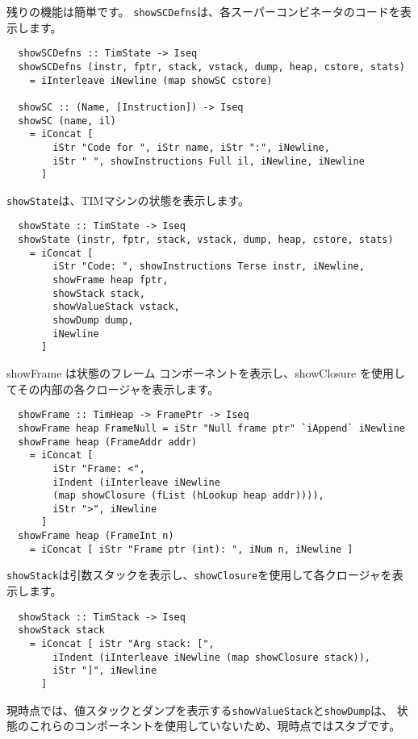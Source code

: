 \documentclass{jarticle}
\begin{document}
残りの機能は簡単です。
\texttt{showSCDefns}は、各スーパーコンビネータのコードを表示します。

\begin{verbatim}
  showSCDefns :: TimState -> Iseq
  showSCDefns (instr, fptr, stack, vstack, dump, heap, cstore, stats)
    = iInterleave iNewline (map showSC cstore)

  showSC :: (Name, [Instruction]) -> Iseq
  showSC (name, il)
    = iConcat [
        iStr "Code for ", iStr name, iStr ":", iNewline,
        iStr " ", showInstructions Full il, iNewline, iNewline
      ]
\end{verbatim}

\texttt{showState}は、TIMマシンの状態を表示します。

\begin{verbatim}
  showState :: TimState -> Iseq
  showState (instr, fptr, stack, vstack, dump, heap, cstore, stats)
    = iConcat [
        iStr "Code: ", showInstructions Terse instr, iNewline,
        showFrame heap fptr,
        showStack stack,
        showValueStack vstack,
        showDump dump,
        iNewline
      ]
\end{verbatim}

showFrame は状態のフレーム コンポーネントを表示し、showClosure を使用してその内部の各クロージャを表示します。

\begin{verbatim}
  showFrame :: TimHeap -> FramePtr -> Iseq
  showFrame heap FrameNull = iStr "Null frame ptr" `iAppend` iNewline
  showFrame heap (FrameAddr addr)
    = iConcat [
        iStr "Frame: <",
        iIndent (iInterleave iNewline
        (map showClosure (fList (hLookup heap addr)))),
        iStr ">", iNewline
      ]
  showFrame heap (FrameInt n)
    = iConcat [ iStr "Frame ptr (int): ", iNum n, iNewline ]
\end{verbatim}

\texttt{showStack}は引数スタックを表示し、\texttt{showClosure}を使用して各クロージャを表示します。

\begin{verbatim}
  showStack :: TimStack -> Iseq
  showStack stack
    = iConcat [ iStr "Arg stack: [",
        iIndent (iInterleave iNewline (map showClosure stack)),
        iStr "]", iNewline
      ]
\end{verbatim}

現時点では、値スタックとダンプを表示する\texttt{showValueStack}と\texttt{showDump}は、
状態のこれらのコンポーネントを使用していないため、現時点ではスタブです。
\end{document}
